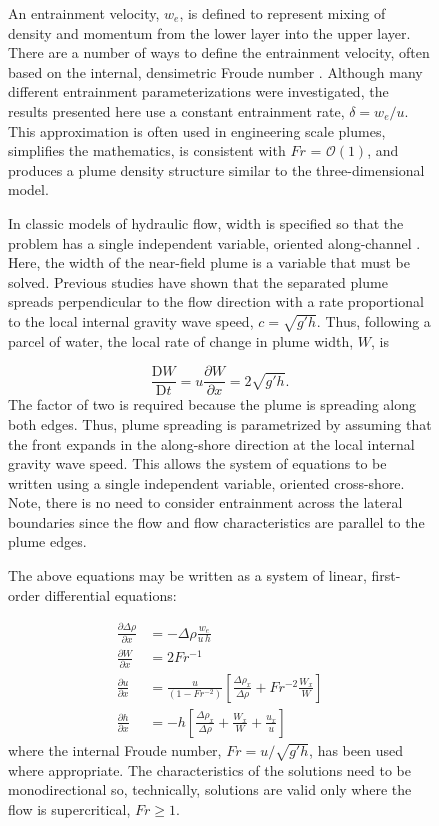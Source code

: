 \documentclass[11pt]{report}
\numberwithin{equation}{section}
\begin{document}
\begin{figure}
An entrainment velocity, $w_e$, is defined to represent mixing of density and momentum from the lower layer into the upper layer.  There are a number of ways to define the entrainment velocity, often based on the internal, densimetric Froude number \citep[e.g.,][]{ellison.turner:59, turner:73, cenedese.ea:04}.  Although many different entrainment parameterizations were investigated, the results presented here use a constant entrainment rate, $\delta = w_e/u$.  This approximation is often used in engineering scale plumes, simplifies the mathematics, is consistent with $Fr$ = $\mathcal{O}(1)$, and produces a plume density structure similar to the three-dimensional model.  

In classic models of hydraulic flow, width is specified so that the problem has a single independent variable, oriented along-channel \citep[see][]{armi.farmer:86,turner:73,baines:95}.  Here, the width of the near-field plume is a variable that must be solved.  Previous studies \citep{wright.coleman:71, hetland.macdonald:08} have shown that the separated plume spreads perpendicular to the flow direction with a rate proportional to the local internal gravity wave speed, $c = \sqrt{g' h}$.  Thus, following a parcel of water, the local rate of change in plume width, $W$, is

\begin{equation}
\frac{\mathrm{D} W}{\mathrm{D} t} = u \frac{\partial W}{\partial x} = 2 \sqrt{g' h}. \label{eq:width_full}
\end{equation}
The factor of two is required because the plume is spreading along both edges.  Thus, plume spreading is parametrized by assuming that the front expands in the along-shore direction at the local internal gravity wave speed.  This allows the system of equations to be written using a single independent variable, oriented cross-shore.  Note, there is no need to consider entrainment across the lateral boundaries \citep[as in, e.g.,][]{odonnell:90} since the flow and flow characteristics are parallel to the plume edges.  

The above equations may be written as a system of linear, first-order differential equations:

\begin{align}
\frac{\partial \Delta\rho}{\partial x} &= - \Delta \rho \frac{w_e}{u\,h} \label{eq:mass_sys}\\
\frac{\partial W}{\partial x} &=  2 Fr^{-1}\label{eq:width_sys}\\
\frac{\partial u}{\partial x} &= \frac{u}{(1 - Fr^{-2})}\left[ \frac{\Delta \rho_x}{\Delta \rho} + Fr^{-2} \frac{W_x}{W} \right] \label{eq:moment_sys}\\
\frac{\partial h}{\partial x} &= - h \left[  \frac{\Delta\rho_x}{\Delta\rho} + \frac{W_x}{W} +  \frac{u_x}{u} \right] \label{eq:cont_sys}
\end{align}
where the internal Froude number, $Fr = u/\sqrt{g' h}$, has been used where appropriate.  The characteristics of the solutions need to be monodirectional so, technically, solutions are valid only where the flow is supercritical, $Fr \ge 1$.


\end{figure}
\end{document}
